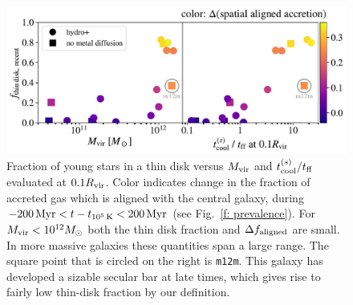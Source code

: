 \documentclass[fleqn,usenatbib]{mnras}
\newcommand{\tcon}{t_{10^5\,{\rm K}}}
\begin{document}
\begin{figure}
    \centering
    \includegraphics[width=\textwidth]{figures/prevalence/aligned_fraction_vs_galaxy_props.pdf}
    \caption{
    Fraction of young stars in a thin disk versus $M_{\rm vir}$ and $t_{\rm cool}^{(s)}/t_{\rm ff}$ evaluated at $0.1 R_{\rm vir}$.
    Color indicates change in the fraction of accreted gas which is aligned with the central galaxy, during $-200\,{\rm Myr} < t-\tcon < 200\,{\rm Myr}$ (see Fig.~\ref{f: prevalence}).
    For $M_{\rm vir} < 10^{12} M_\odot$ both the thin disk fraction and $\Delta f_{\rm aligned}$ are small.
    In more massive galaxies these quantities span a large range.
    The square point that is circled on the right is \texttt{m12m}.
    This galaxy has developed a sizable secular bar at late times, which gives rise to fairly low thin-disk fraction by our definition. 
    }
    \label{f: prevalence vs galaxy properties}
\end{figure}

\newcommand{\tcoolsh}{t_{\rm cool}^{(s)}}
\newcommand{\tff}{t_{\rm ff}}
\newcommand{\Mvir}{M_{\rm vir}}
\end{document}
